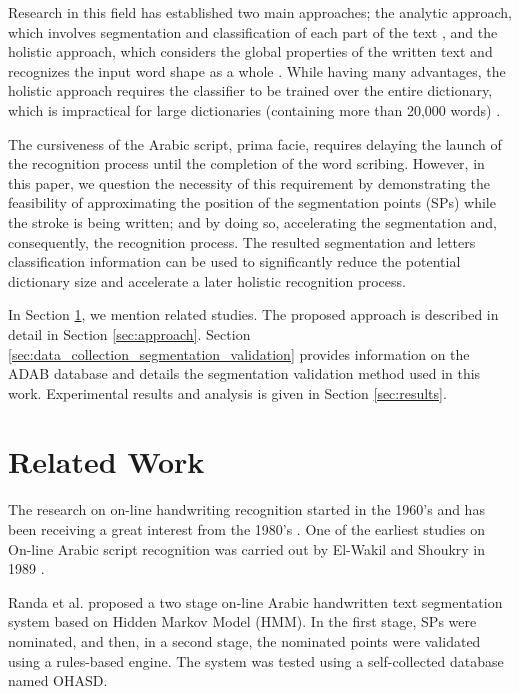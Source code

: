 \documentclass[10pt, conference, compsocconf]{IEEEtran}
\begin{document}
Research in this field has established two main approaches; the analytic approach, which involves segmentation and classification of each part of the text \cite{abdulla2008off, sari2002off, Dinges2011}, and the holistic approach, which considers the global properties of the written text and recognizes the input word shape as a whole \cite{biadsy2011segmentation, saabni2009hierarchical}. 
While having many advantages, the holistic approach requires the classifier to be trained over the entire dictionary, which is impractical for large dictionaries (containing more than 20,000 words) \cite{elanwar2012unconstrained}.

The cursiveness of the Arabic script, prima facie, requires delaying the launch of the recognition process until the completion of the word scribing. 
However, in this paper, we question the necessity of this requirement by demonstrating the feasibility of approximating the position of the segmentation points (SPs) while the stroke is being written; and by doing so, accelerating the segmentation and, consequently, the recognition process. 
The resulted segmentation and letters classification information can be used to significantly reduce the potential dictionary size and accelerate a later holistic recognition process.

In Section \ref{sec:related_work}, we mention related studies.
The proposed approach is described in detail in Section \ref{sec:approach}.
Section \ref{sec:data_collection_segmentation_validation} provides information on the ADAB database and details the segmentation validation method used in this work.
Experimental results and analysis is given in Section \ref{sec:results}. 

\section{Related Work}
\label{sec:related_work}

The research on on-line handwriting recognition started in the 1960's and has been receiving a great interest from the 1980's \cite{tagougui2013online}. 
One of the earliest studies on On-line Arabic script recognition was carried out by El-Wakil and Shoukry in 1989 \cite{el1989line}.

Randa et al. \cite{elanwar2012unconstrained} proposed a two stage on-line Arabic handwritten text segmentation system based on Hidden Markov Model (HMM). 
In the first stage, SPs were nominated, and then, in a second stage, the nominated points were validated using a rules-based engine. 
The system was tested using a self-collected database named OHASD.
\end{document}
